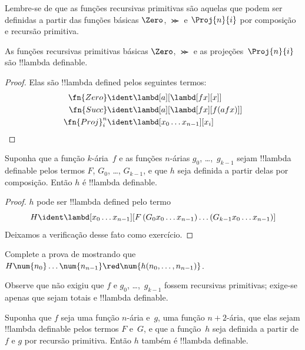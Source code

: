 \documentclass[../../../include/open-logic-section]{subfiles}
\begin{document}

Lembre-se de que as funções recursivas primitivas são aquelas que podem ser
definidas a partir das funções básicas $\Zero$, $\Succ$ e $\Proj{n}{i}$
por composição e recursão primitiva.

\begin{lem}
  As funções recursivas primitivas básicas $\Zero$, $\Succ$ e as
  projeções~$\Proj{n}{i}$ são !!{lambda definable}.
\end{lem}

\begin{proof}
Elas são !!{lambda define}d pelos seguintes termos:
\begin{align*}
  \fn{Zero} & \ident \lambd[a][\lambd[fx][x]]\\
  \fn{Succ} & \ident \lambd[a][\lambd[fx][f (a f x)]] \\
  \fn{Proj}^n_i & \ident \lambd[x_0\dots x_{n-1}][x_i]
\end{align*}
\end{proof}

\begin{lem}
   Suponha que a função $k$-ária~$f$ e as funções $n$-árias
  $g_0$, \dots,~$g_{k-1}$ sejam !!{lambda definable} pelos termos
  $F$, $G_0$, \dots, $G_{k-1}$, e que $h$ seja definida a partir delas por
  composição. Então $h$ é !!{lambda definable}.
\end{lem}

\begin{proof}
  $h$ pode ser !!{lambda define}d pelo termo
  \[
  H \ident \lambd[x_0 \dots x_{n-1}][F\, (G_0 x_0 \dots
    x_{n-1}) \dots (G_{k-1} x_0 \dots x_{n-1})]
  \]
  Deixamos a verificação desse fato como exercício.
\end{proof}

\begin{prob}
  Complete a prova de  mostrando
  que $H\num{n_0}\dots\num{n_{n-1}} \red \num{h(n_0, \dots,
    n_{n-1})}$.
\end{prob}

Observe que  não exigiu que $f$ e $g_0$,
\dots,~$g_{k-1}$ fossem recursivas primitivas; exige-se apenas que
sejam totais e !!{lambda definable}.

\begin{lem}
  Suponha que $f$ seja uma função $n$-ária e~$g$, uma função $n+2$-ária,
  que elas sejam !!{lambda definable} pelos termos $F$ e~$G$, e que a
  função~$h$ seja definida a partir de $f$ e $g$ por recursão
  primitiva. Então $h$ também é !!{lambda definable}.
\end{lem}
\end{document}
